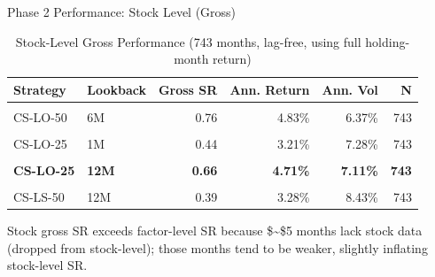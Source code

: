 \documentclass[
  ignorenonframetext,
  aspectratio=169]{beamer}
\begin{document}
\begin{frame}{Phase 2 Performance: Stock Level (Gross)}
\label{phase-2-performance-stock-level-gross}
\begin{table}[!h]
\centering
\caption{\label{tab:p2-stock-gross}Stock-Level Gross Performance (743 months, lag-free, using full holding-month return)}
\centering
\fontsize{8}{10}\selectfont
\begin{tabular}[t]{llrrrr}
\toprule
Strategy & Lookback & Gross SR & Ann. Return & Ann. Vol & N\\
\midrule
\cellcolor{gray!10}{CS-LO-50} & \cellcolor{gray!10}{1M} & \cellcolor{gray!10}{0.68} & \cellcolor{gray!10}{4.42\%} & \cellcolor{gray!10}{6.53\%} & \cellcolor{gray!10}{743}\\
CS-LO-50 & 6M & 0.76 & 4.83\% & 6.37\% & 743\\
\textbf{\cellcolor{gray!10}{CS-LO-50}} & \textbf{\cellcolor{gray!10}{12M}} & \textbf{\cellcolor{gray!10}{0.83}} & \textbf{\cellcolor{gray!10}{5.05\%}} & \textbf{\cellcolor{gray!10}{6.12\%}} & \textbf{\cellcolor{gray!10}{743}}\\
CS-LO-25 & 1M & 0.44 & 3.21\% & 7.28\% & 743\\
\cellcolor{gray!10}{CS-LO-25} & \cellcolor{gray!10}{6M} & \cellcolor{gray!10}{0.57} & \cellcolor{gray!10}{4.10\%} & \cellcolor{gray!10}{7.15\%} & \cellcolor{gray!10}{743}\\
\addlinespace
\textbf{CS-LO-25} & \textbf{12M} & \textbf{0.66} & \textbf{4.71\%} & \textbf{7.11\%} & \textbf{743}\\
\cellcolor{gray!10}{CS-LS-50} & \cellcolor{gray!10}{1M} & \cellcolor{gray!10}{0.22} & \cellcolor{gray!10}{1.79\%} & \cellcolor{gray!10}{8.21\%} & \cellcolor{gray!10}{743}\\
CS-LS-50 & 12M & 0.39 & 3.28\% & 8.43\% & 743\\
\bottomrule
\end{tabular}
\end{table}

\small Stock gross SR exceeds factor-level SR because \$\sim\$5 months
lack stock data (dropped from stock-level); those months tend to be
weaker, slightly inflating stock-level SR.
\end{frame}
\end{document}

